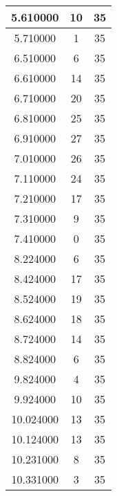 \begin{longtable}[htbp]{|c|c|c|}
5.610000 & 10 & 35 \\ \hline
5.710000 & 1 & 35 \\ \hline
6.510000 & 6 & 35 \\ \hline
6.610000 & 14 & 35 \\ \hline
6.710000 & 20 & 35 \\ \hline
6.810000 & 25 & 35 \\ \hline
6.910000 & 27 & 35 \\ \hline
7.010000 & 26 & 35 \\ \hline
7.110000 & 24 & 35 \\ \hline
7.210000 & 17 & 35 \\ \hline
7.310000 & 9 & 35 \\ \hline
7.410000 & 0 & 35 \\ \hline
8.224000 & 6 & 35 \\ \hline
8.424000 & 17 & 35 \\ \hline
8.524000 & 19 & 35 \\ \hline
8.624000 & 18 & 35 \\ \hline
8.724000 & 14 & 35 \\ \hline
8.824000 & 6 & 35 \\ \hline
9.824000 & 4 & 35 \\ \hline
9.924000 & 10 & 35 \\ \hline
10.024000 & 13 & 35 \\ \hline
10.124000 & 13 & 35 \\ \hline
10.231000 & 8 & 35 \\ \hline
10.331000 & 3 & 35 \\ \hline
\end{longtable}
